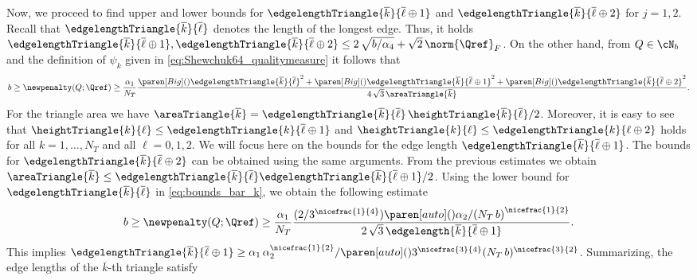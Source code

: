 Now, we proceed to find upper and lower bounds for $\edgelengthTriangle{\overline{k}}{\overline{\ell} \oplus 1}$ and $\edgelengthTriangle{\overline{k}}{\overline{\ell} \oplus 2}$ for $j = 1,2$.
Recall that $\edgelengthTriangle{\overline{k}}{\overline{\ell}}$ denotes the length of the longest edge.
Thus, it holds $\edgelengthTriangle{\overline{k}}{\overline{\ell} \oplus 1},\edgelengthTriangle{\overline{k}}{\overline{\ell} \oplus 2} \le  2 \, \sqrt{b / \alpha_4} + \sqrt{2} \, \norm{\Qref}_F $.
On the other hand, from $Q \in \cN_b$ and the definition of $\psi_k$ given in \eqref{eq:Shewchuk64_qualitymeasure} it follows that
\begin{equation*}
	b
	\ge
	\newpenalty(Q;\Qref)
	\ge
	\frac{\alpha_1}{N_T}
	\frac{
		\paren[Big](){\edgelengthTriangle{\overline{k}}{\overline{\ell}}}^2
		+
		\paren[Big](){\edgelengthTriangle{\overline{k}}{\overline{\ell} \oplus 1}}^2
		+
		\paren[Big](){\edgelengthTriangle{\overline{k}}{\overline{\ell} \oplus 2}}^2
	}{4 \, \sqrt{3} \, \areaTriangle{\overline{k}}}
	.
\end{equation*}
For the triangle area we have $\areaTriangle{\overline{k}} = \edgelengthTriangle{\overline{k}}{\overline{\ell}} \, \heightTriangle{\overline{k}}{\overline{\ell}} / 2$.
Moreover, it is easy to see that $\heightTriangle{k}{\ell}\le \edgelengthTriangle{k}{\overline{\ell} \oplus 1}$ and $\heightTriangle{k}{\ell}\le \edgelengthTriangle{k}{\ell \oplus 2}$ holds for all $k=1,\ldots,N_T$ and all $\ell=0,1,2$.
We will focus here on the bounds for the edge length $\edgelengthTriangle{\overline{k}}{\overline{\ell} \oplus 1}$.
The bounds for $\edgelengthTriangle{\overline{k}}{\overline{\ell} \oplus 2}$ can be obtained using the same arguments.
From the previous estimates we obtain $\areaTriangle{\overline{k}} \le \edgelengthTriangle{\overline{k}}{\overline{\ell}} \edgelengthTriangle{\overline{k}}{\overline{\ell} \oplus 1} / 2$.
Using the lower bound for $\edgelengthTriangle{\overline{k}}{\overline{\ell}}$ in \eqref{eq:bounds_bar_k}, we obtain the following estimate
\begin{equation*}
	b
	\ge
	\newpenalty(Q;\Qref)
	\ge
	\frac{\alpha_1}{N_T}
	\frac{(2 / 3^{\nicefrac{1}{4}}) \paren[auto](){\alpha_2 / (N_T \, b)}^{\nicefrac{1}{2}}}{2 \, \sqrt{3} \, \edgelength{\overline{k}}{\overline{\ell} \oplus 1}}
	.
\end{equation*}
This implies $\edgelengthTriangle{\overline{k}}{\overline{\ell} \oplus 1} \ge \alpha_1 \, \alpha_2^{\nicefrac{1}{2}} / \paren[auto](){{3^{\nicefrac{3}{4}}(N_T \, b)^{\nicefrac{3}{2}}}}$.
Summarizing, the edge lengths of the $\overline{k}$-th triangle satisfy
